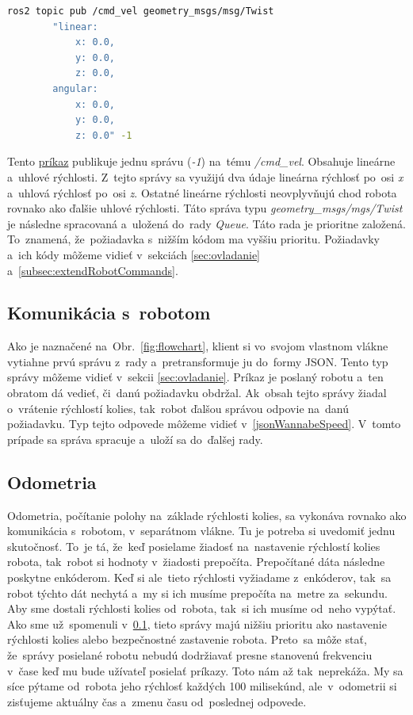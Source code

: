 \label{requestCommand}
\begin{lstlisting}[language=bash]
	ros2 topic pub /cmd_vel geometry_msgs/msg/Twist
		"linear:
			x: 0.0,
			y: 0.0,
			z: 0.0,
		angular:
			x: 0.0,
			y: 0.0,
			z: 0.0" -1
\end{lstlisting}

Tento \hyperref[requestCommand]{príkaz} publikuje jednu správu (\textit{-1}) na~tému \textit{/cmd\_vel}.
Obsahuje lineárne a~uhlové rýchlosti. Z~tejto správy sa využijú dva údaje lineárna rýchlosť
po~osi \textit{x} a~uhlová rýchlosť po~osi \textit{z}. Ostatné lineárne rýchlosti neovplyvňujú
chod robota rovnako ako ďalšie uhlové rýchlosti. Táto správa typu \textit{geometry\_msgs/mgs/Twist}
je následne spracovaná a~uložená do~rady \textit{Queue}. Táto rada je prioritne založená.
To~znamená, že~požiadavka s~nižším kódom ma vyššiu prioritu. Požiadavky a~ich kódy môžeme vidieť v~sekciách \ref{sec:ovladanie} a~\ref{subsec:extendRobotCommands}.

\subsection{Komunikácia s~robotom}
\label{sec:robotComms}

Ako je naznačené na~Obr.~\ref{fig:flowchart}, klient si vo~svojom vlastnom vlákne vytiahne
prvú správu z~rady a~pretransformuje ju do~formy JSON. Tento typ správy môžeme vidieť v~sekcii
\ref{sec:ovladanie}. Príkaz je poslaný robotu a~ten obratom dá vedieť, či~danú požiadavku obdržal.
Ak~obsah tejto správy žiadal o~vrátenie rýchlostí kolies, tak~robot ďalšou správou odpovie
na~danú požiadavku. Typ tejto odpovede môžeme vidieť v~\ref{jsonWannabeSpeed}. V~tomto prípade
sa správa spracuje a~uloží sa do~ďalšej rady.

\subsection{Odometria}
\label{sec:odometria}

Odometria, počítanie polohy na~základe rýchlosti kolies, sa vykonáva rovnako ako komunikácia
s~robotom, v~separátnom vlákne. Tu je potreba si uvedomiť jednu skutočnosť. To~je tá, že~keď
posielame žiadosť na~nastavenie rýchlostí kolies robota, tak~robot si hodnoty v~žiadosti prepočíta.
Prepočítané dáta následne poskytne enkóderom. Keď si ale~tieto rýchlosti vyžiadame z~enkóderov,
tak~sa robot týchto dát nechytá a~my si ich musíme prepočíta na~metre za~sekundu. Aby sme dostali
rýchlosti kolies od~robota, tak~si ich musíme od~neho vypýtať. Ako sme už~spomenuli v~\ref{sec:robotComms},
tieto správy majú nižšiu prioritu ako nastavenie rýchlosti kolies alebo bezpečnostné zastavenie
robota. Preto~sa môže stať, že~správy posielané robotu nebudú dodržiavať presne stanovenú frekvenciu
v~čase keď mu bude užívateľ posielať príkazy. Toto nám až tak~neprekáža. My sa síce pýtame od~robota
jeho rýchlosť každých 100 milisekúnd, ale~v~odometrii si zisťujeme aktuálny čas a~zmenu času od~poslednej
odpovede.

